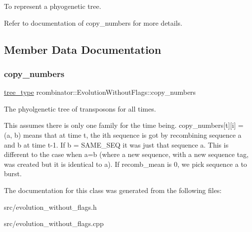 To represent a phyogenetic tree. 

Refer to documentation of {\ttfamily copy\+\_\+numbers} for more details. 

\subsection{Member Data Documentation}
\mbox{\label{classrcombinator_1_1EvolutionWithoutFlags_a4aeca4ee651183448dc8c2468d29e4ee}} 
\subsubsection{\texorpdfstring{copy\+\_\+numbers}{copy\_numbers}}
{\footnotesize\ttfamily \mbox{\hyperlink{classrcombinator_1_1EvolutionWithoutFlags_a5c2d91575aad05a457c00ee897e3bdc1}{tree\+\_\+type}} rcombinator\+::\+Evolution\+Without\+Flags\+::copy\+\_\+numbers\hspace{0.3cm}{\ttfamily [private]}}



The phyolgenetic tree of transposons for all times. 

This assumes there is only one family for the time being. copy\+\_\+numbers\mbox{[}t\mbox{]}\mbox{[}i\mbox{]} = (a, b) means that at time t, the ith sequence is got by recombining sequence a and b at time t-\/1. If b = S\+A\+M\+E\+\_\+\+S\+EQ it was just that sequence a. This is different to the case when a=b (where a new sequence, with a new sequence tag, was created but it is identical to a). If recomb\+\_\+mean is 0, we pick sequence a to burst. 

The documentation for this class was generated from the following files\+:\begin{DoxyCompactItemize}
\item 
src/evolution\+\_\+without\+\_\+flags.\+h\item 
src/evolution\+\_\+without\+\_\+flags.\+cpp\end{DoxyCompactItemize}
